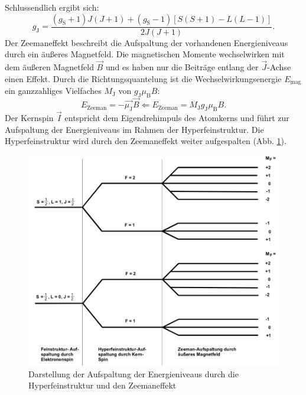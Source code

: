 Schlussendlich ergibt sich:
\begin{equation}
  g_{\text{J}}= \frac{\left(g_{\text{S}} +1 \right)J\left(J+1\right) + \left(g_{\text{S}}-1\right) \left[ S\left(S+1\right)-L\left(L-1\right) \right]   }{2J\left(J+1\right)}.
\label{eqn:landej}
\end{equation}
%
%
Der Zeemaneffekt beschreibt die Aufspaltung der vorhandenen Energieniveaus durch ein äußeres Magnetfeld.
Die magnetischen Momente wechselwirken mit dem äußeren Magnetfeld $\vec{B}$ und es haben nur die Beiträge entlang der $\vec{J}$-Achse einen Effekt.
Durch die Richtungsquantelung ist die Wechselwirkungsenergie $E_{\text{mag}}$ ein ganzzahliges Vielfaches $M_{\text{J}}$ von $g_{\text{J}} \mu_{\text{B}} B$:
\begin{equation}
  E_{\text{Zeeman}} = -\vec{\mu_{\text{J}}} \vec{B} \Leftarrow E_{\text{Zeeman}} = M_{\text{J}} g_{\text{J}} \mu_{\text{B}} B.
  \label{eqn:zeeman}
\end{equation}
%
%
Der Kernspin $\vec{I}$ entspricht dem Eigendrehimpuls des Atomkerns und führt zur Aufspaltung der Energieniveaus im Rahmen der Hyperfeinstruktur.
Die Hyperfeinstruktur wird durch den Zeemaneffekt weiter aufgespalten (Abb. \ref{fig:kernspin}).
\begin{figure}[h!]
  \centering
  \includegraphics[width=\textwidth]{kernspin1.png}
  \caption{Darstellung der Aufspaltung der Energieniveaus durch die Hyperfeinstruktur und den Zeemaneffekt \cite{1}}
  \label{fig:kernspin}
\end{figure}
